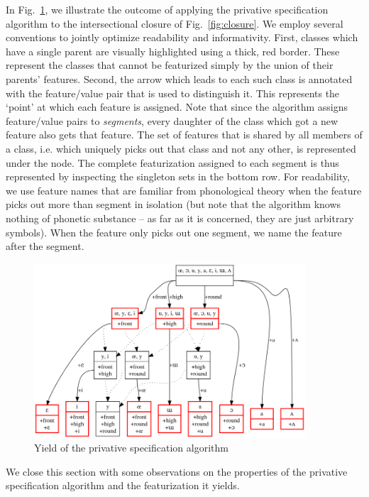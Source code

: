 \documentclass[11pt, oneside]{article}   	%
\begin{document}
\vspace{\baselineskip} In Fig.~\ref{fig:privative}, we illustrate the outcome of applying the privative specification algorithm to the intersectional closure of Fig.~\ref{fig:closure}. We employ several conventions to jointly optimize readability and informativity. First, classes which have a single parent are visually highlighted using a thick, red border. These represent the classes that cannot be featurized simply by the union of their parents' features. Second, the arrow which leads to each such class is annotated with the feature/value pair that is used to distinguish it. This represents the `point' at which each feature is assigned. Note that since the algorithm assigns feature/value pairs to \textit{segments}, every daughter of the class which got a new feature also gets that feature. The set of features that is shared by all members of a class, i.e. which uniquely picks out that class and not any other, is represented under the node. The complete featurization assigned to each segment is thus represented by inspecting the singleton sets in the bottom row. For readability, we use feature names that are familiar from phonological theory when the feature picks out more than segment in isolation (but note that the algorithm knows nothing of phonetic substance -- as far as it is concerned, they are just arbitrary symbols). When the feature only picks out one segment, we name the feature after the segment.

\begin{figure}[h]
\includegraphics[width=0.9\textwidth]{vowelHarmony_privative.png}
\caption{Yield of the privative specification algorithm}
\label{fig:privative}
\end{figure}

We close this section with some observations on the properties of the privative specification algorithm and the featurization it yields. 
\end{document}
